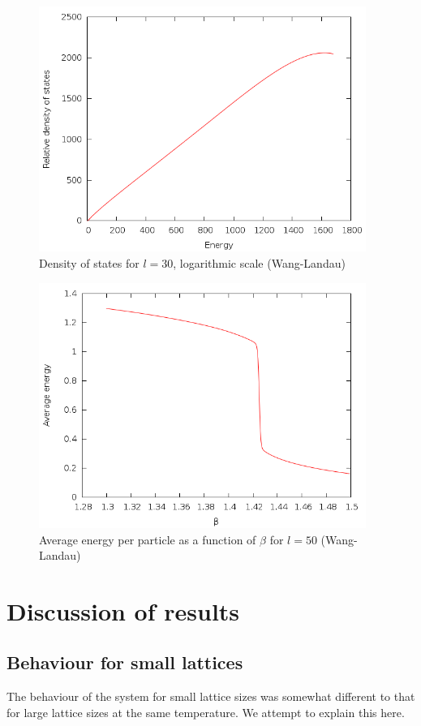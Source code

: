 \documentclass{article}
\begin{document}
\begin{figure}[H]
\includegraphics[height=8cm]{../results/wanglandau/s30.png}
\caption{Density of states for $l = 30$, logarithmic scale (Wang-Landau)}
\label{fig:s30}
\end{figure}

\begin{figure}[h]
\includegraphics[height=8cm]{../results/wanglandau/e50.png}
\caption{Average energy per particle as a function of $\beta$ for $l = 50$ (Wang-Landau)}
\label{fig:e50}
\end{figure}

\section{Discussion of results}
\subsection{Behaviour for small lattices}
The behaviour of the system for small lattice sizes was somewhat different to that for large lattice sizes at the same temperature.
We attempt to explain this here.
\end{document}
